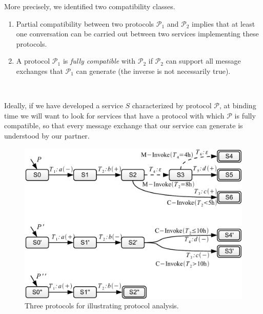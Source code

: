 More precisely, we identified two compatibility classes.
\begin{enumerate}

	\item Partial compatibility between two protocols $\mathcal{P}_1$ and $\mathcal{P}_2$ implies that at least one conversation can be carried out between two services implementing these protocols.

  \item A protocol $\mathcal{P}_1$ is \emph{fully compatible} with $\mathcal{P}_2$ if $\mathcal{P}_2$ can support all message exchanges that $\mathcal{P}_1$ can generate (the inverse is not necessarily true).

\end{enumerate}\

Ideally, if we have developed a service $S$ characterized by protocol $\mathcal{P}$, at binding time we will want to look for services that have a protocol with which $\mathcal{P}$ is fully compatible, so that every message exchange that our service can generate is understood by our partner.\\

\begin{figure}[thbp]
    \centering
    \includegraphics[width=\textwidth]{content/protocol-analysis/analysis}
    \caption{Three protocols for illustrating protocol analysis.}
    \label{fig:analysis}
\end{figure}

